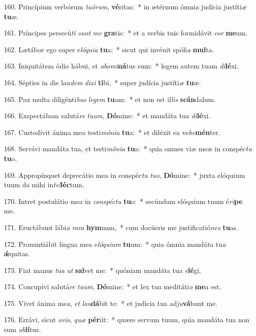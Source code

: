 160. Princípium verbórum \textit{tu}\textit{ó}\textit{rum}, \textbf{vé}ritas:~*  in ætérnum ómnia judícia justíti\textit{æ} \textbf{tu}æ.\

161. Príncipes persecú\textit{ti} \textit{sunt} \textit{me} \textbf{gra}tis:~*  et a verbis tuis formidávit \textit{cor} \textbf{me}um.\

162. Lætábor ego super e\textit{ló}\textit{qui}\textit{a} \textbf{tu}a:~*  sicut qui invénit spóli\textit{a} \textbf{mul}ta.\

163. Iniquitátem ódio hábui, et \textit{ab}\textit{o}\textit{mi}\textbf{ná}tus sum:~*  legem autem tuam \textit{di}\textbf{lé}xi.\

164. Sépties in die lau\textit{dem} \textit{di}\textit{xi} \textbf{ti}bi,~*  super judícia justíti\textit{æ} \textbf{tu}æ.\

165. Pax multa diligénti\textit{bus} \textit{le}\textit{gem} \textbf{tu}am:~*  et non est il\textit{lis} \textbf{scán}dalum.\

166. Exspectábam salutá\textit{re} \textit{tu}\textit{um}, \textbf{Dó}mine:~*  et mandáta tua \textit{di}\textbf{lé}xi.\

167. Custodívit ánima mea testi\textit{mó}\textit{ni}\textit{a} \textbf{tu}a:~*  et diléxit ea ve\textit{he}\textbf{mén}ter.\

168. Servávi mandáta tua, et testi\textit{mó}\textit{ni}\textit{a} \textbf{tu}a:~*  quia omnes viæ meæ in conspéc\textit{tu} \textbf{tu}o.\

169. Appropínquet deprecátio mea in conspéc\textit{tu} \textit{tu}\textit{o}, \textbf{Dó}mine:~*  juxta elóquium tuum da mihi in\textit{tel}\textbf{léc}tum.\

170. Intret postulátio mea in \textit{con}\textit{spéc}\textit{tu} \textbf{tu}o:~*  secúndum elóquium tuum é\textit{ri}\textbf{pe} me.\

171. Eructábunt lábi\textit{a} \textit{me}\textit{a} \textbf{hym}num,~*  cum docúeris me justificatió\textit{nes} \textbf{tu}as.\

172. Pronuntiábit lingua mea e\textit{ló}\textit{qui}\textit{um} \textbf{tu}um:~*  quia ómnia mandáta tu\textit{a} \textbf{ǽ}quitas.\

173. Fiat manus \textit{tu}\textit{a} \textit{ut} \textbf{sal}vet me:~*  quóniam mandáta tua \textit{e}\textbf{lé}gi.\

174. Concupívi salutá\textit{re} \textit{tu}\textit{um}, \textbf{Dó}mine:~*  et lex tua meditáti\textit{o} \textbf{me}a est.\

175. Vivet ánima me\textit{a}, \textit{et} \textit{lau}\textbf{dá}bit te:~*  et judícia tua ad\textit{ju}\textbf{vá}bunt me.\

176. Errávi, sicut \textit{o}\textit{vis}, \textit{quæ} \textbf{pér}iit:~*  quære servum tuum, quia mandáta tua non sum \textit{ob}\textbf{lí}tus.\

